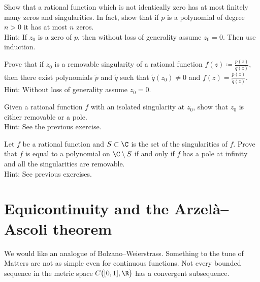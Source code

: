 \begin{exercise}
Show that a rational function which is not identically
zero has at most finitely many zeros and
singularities.  In fact, show that if $p$ is a polynomial of 
degree $n > 0$ it has at most $n$ zeros.
\\
Hint: If $z_0$ is a zero of $p$, then without loss of generality assume $z_0 =
0$.  Then use induction.
\end{exercise}

\begin{exercise}
Prove that if $z_0$ is a removable singularity of a rational
function $f(z) \coloneqq \frac{p(z)}{q(z)}$, then there exist
polynomials $\widetilde{p}$ and $\widetilde{q}$ such that
$\widetilde{q}(z_0) \not= 0$ and $f(z) =
\frac{\widetilde{p}(z)}{\widetilde{q}(z)}$.
\\
Hint: Without loss of generality assume $z_0 = 0$.
\end{exercise}

\begin{exercise}
Given a rational function $f$ with an isolated singularity at $z_0$,
show that $z_0$ is either removable or a pole.
\\
Hint: See the previous exercise.
\end{exercise}

\begin{exercise}
Let $f$ be a rational function and $S \subset \C$ is the 
set of the singularities of $f$.
Prove that $f$ is equal to a polynomial on $\C \setminus S$
if and only if
$f$ has a pole at infinity and all the singularities are removable.
\\
Hint: See previous exercises.
\end{exercise}




\sectionnewpage
\section{Equicontinuity and the Arzel\`a--Ascoli theorem}
\label{sec:arzelaascoli}


We would like an analogue of Bolzano--Weierstrass.  Something to the tune of
Matters are not
as simple even for continuous functions. 
Not every bounded sequence in the metric space $C\bigl([0,1],\R\bigr)$ has
a convergent subsequence.

